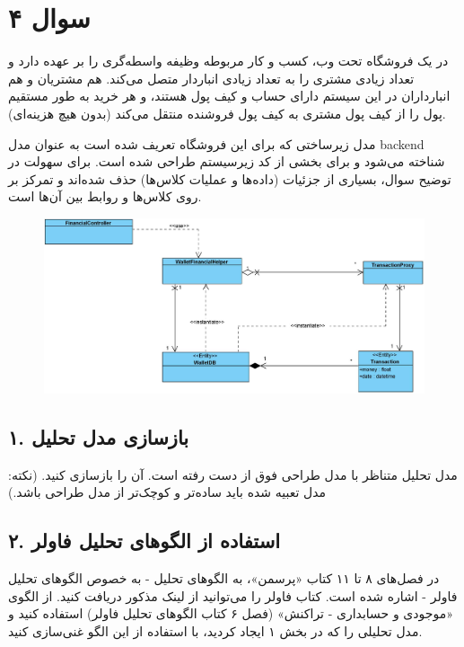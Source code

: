 \section*{سوال ۴}

در یک فروشگاه تحت وب، کسب و کار مربوطه وظیفه واسطه‌گری را بر عهده دارد و تعداد زیادی مشتری را به تعداد زیادی انباردار متصل می‌کند. هم مشتریان و هم انبارداران در این سیستم دارای حساب و کیف پول هستند، و هر خرید به طور مستقیم پول را از کیف پول مشتری به کیف پول فروشنده منتقل می‌کند (بدون هیچ هزینه‌ای).

مدل زیرساختی که برای این فروشگاه تعریف شده است به عنوان مدل backend شناخته می‌شود و برای بخشی از کد زیرسیستم طراحی شده است. برای سهولت در توضیح سوال، بسیاری از جزئیات (داده‌ها و عملیات کلاس‌ها) حذف شده‌اند و تمرکز بر روی کلاس‌ها و روابط بین آن‌ها است.

\begin{figure}[h]
	\centering
	\includegraphics{pic1.jpg}
	\label{fig:label4}
\end{figure}

\subsection*{۱. بازسازی مدل تحلیل}
مدل تحلیل متناظر با مدل طراحی فوق از دست رفته است. آن را بازسازی کنید. (نکته: مدل تعبیه شده باید ساده‌تر و کوچک‌تر از مدل طراحی باشد.)

\subsection*{۲. استفاده از الگوهای تحلیل فاولر}
در فصل‌های ۸ تا ۱۱ کتاب «پرسمن»، به الگوهای تحلیل - به خصوص الگوهای تحلیل فاولر - اشاره شده است. کتاب فاولر را می‌توانید از لینک مذکور دریافت کنید. از الگوی «موجودی و حسابداری - تراکنش» (فصل ۶ کتاب الگوهای تحلیل فاولر) استفاده کنید و مدل تحلیلی را که در بخش ۱ ایجاد کردید، با استفاده از این الگو غنی‌سازی کنید.

